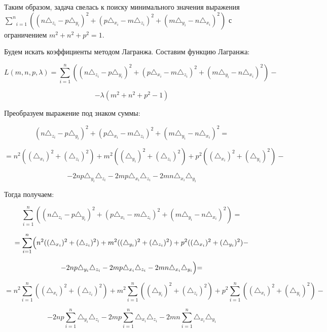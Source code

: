 \documentclass[article,final,14pt]{scrreprt}
\begin{document}
Таким образом, задача свелась к поиску минимального значения выражения $\underset{i=1}{\overset{n}{\sum}} \left((n \triangle_{z_i} - p \triangle_{y_i})^2 + (p \triangle_{x_i} - m \triangle_{z_i})^2 + (m \triangle_{y_i} - n \triangle_{x_i})^2 \right)$ с ограничением $m^2 + n^2 + p^2=1$.

Будем искать коэффициенты методом Лагранжа. Составим функцию Лагранжа:

$$L(m, n, p, \lambda) = \underset{i=1}{\overset{n}{\sum}} \left((n \triangle_{z_i} - p \triangle_{y_i})^2 + (p \triangle_{x_i} - m \triangle_{z_i})^2 + (m \triangle_{y_i} - n \triangle_{x_i})^2 \right) -$$

$$- \lambda (m^2 + n^2 + p^2-1)$$

Преобразуем выражение под знаком суммы:

$$(n \triangle_{z_i} - p \triangle_{y_i})^2 + (p \triangle_{x_i} - m \triangle_{z_i})^2 + (m \triangle_{y_i} - n \triangle_{x_i})^2 = $$

$$ = n^2 ((\triangle_{x_i})^2 + (\triangle_{z_i})^2) + m^2 ((\triangle_{y_i})^2 + (\triangle_{z_i})^2) + p^2 ((\triangle_{x_i})^2 + (\triangle_{y_i})^2) - $$

$$ - 2 n p \triangle_{y_i} \triangle_{z_i} - 2 m p \triangle_{x_i} \triangle_{z_i} - 2 m n \triangle_{x_i} \triangle_{y_i}$$

Тогда получаем:

$$\underset{i=1}{\overset{n}{\sum}} \left((n \triangle_{z_i} - p \triangle_{y_i})^2 + (p \triangle_{x_i} - m \triangle_{z_i})^2 + (m \triangle_{y_i} - n \triangle_{x_i})^2 \right) = $$

$$ = \underset{i=1}{\overset{n}{\sum}} \Bigl( n^2 ((\triangle_{x_i})^2 + (\triangle_{z_i})^2) + m^2 ((\triangle_{y_i})^2 + (\triangle_{z_i})^2) + p^2 ((\triangle_{x_i})^2 + (\triangle_{y_i})^2) - $$

$$ - 2 n p \triangle_{y_i} \triangle_{z_i} - 2 m p \triangle_{x_i} \triangle_{z_i} - 2 m n \triangle_{x_i} \triangle_{y_i} \Bigl) = $$

$$ = n^2 \underset{i=1}{\overset{n}{\sum}} \left((\triangle_{x_i})^2 + (\triangle_{z_i})^2\right) + m^2 \underset{i=1}{\overset{n}{\sum}} \left((\triangle_{y_i})^2 + (\triangle_{z_i})^2\right) + p^2 \underset{i=1}{\overset{n}{\sum}} \left((\triangle_{x_i})^2 + (\triangle_{y_i})^2\right) - $$

$$ - 2 n p \underset{i=1}{\overset{n}{\sum}} \triangle_{y_i} \triangle_{z_i} - 2 m p \underset{i=1}{\overset{n}{\sum}} \triangle_{x_i} \triangle_{z_i} - 2 m n \underset{i=1}{\overset{n}{\sum}} \triangle_{x_i} \triangle_{y_i}$$
\end{document}

